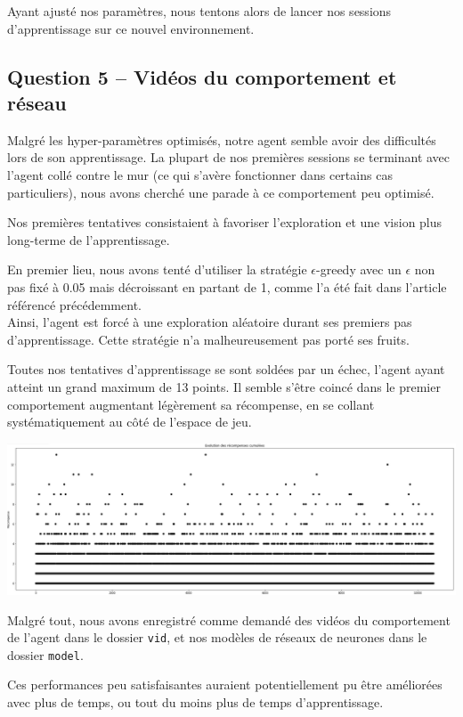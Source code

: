 \documentclass[12pt,french]{article}
\begin{document}
Ayant ajusté nos paramètres, nous tentons alors de lancer nos sessions d'apprentissage sur ce nouvel environnement.

\subsection{Question 5 -- Vidéos du comportement et réseau}

Malgré les hyper-paramètres optimisés, notre agent semble avoir des difficultés lors de son apprentissage. La plupart de nos premières sessions se terminant avec l'agent collé contre le mur (ce qui s'avère fonctionner dans certains cas particuliers), nous avons cherché une parade à ce comportement peu optimisé.

Nos premières tentatives consistaient à favoriser l'exploration et une vision plus long-terme de l'apprentissage.

En premier lieu, nous avons tenté d'utiliser la stratégie $\epsilon$-greedy avec un $\epsilon$ non pas fixé à 0.05 mais décroissant en partant de 1, comme l'a été fait dans l'article référencé précédemment.\\
Ainsi, l'agent est forcé à une exploration aléatoire durant ses premiers pas d'apprentissage. Cette stratégie n'a malheureusement pas porté ses fruits.

Toutes nos tentatives d'apprentissage se sont soldées par un échec, l'agent ayant atteint un grand maximum de 13 points. Il semble s'être coincé dans le premier comportement augmentant légèrement sa récompense, en se collant systématiquement au côté de l'espace de jeu.

\begin{center}
    \includegraphics[width=\textwidth]{../src/img/atari_fail.png}
\end{center}

Malgré tout, nous avons enregistré comme demandé des vidéos du comportement de l'agent dans le dossier \texttt{vid}, et nos modèles de réseaux de neurones dans le dossier \texttt{model}.

Ces performances peu satisfaisantes auraient potentiellement pu être améliorées avec plus de temps, ou tout du moins plus de temps d'apprentissage.
\end{document}
